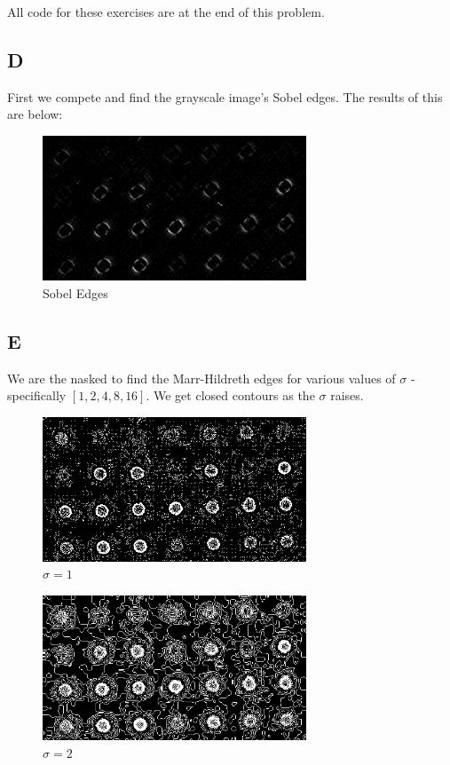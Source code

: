 \documentclass{article}
\begin{document}
All code for these exercises are at the end of this problem.

\subsection*{D}
First we compete and find the grayscale image's Sobel edges. The results of this are below:

\begin{figure}[H]
    \centering
    \includegraphics[width = 0.7\textwidth]{imgs/sobel.jpg}
    \caption{Sobel Edges}
    \label{fig:sobel}
\end{figure}

\subsection*{E}

We are the nasked to find the Marr-Hildreth edges for various values of $\sigma$ - specifically $[1,2,4,8,16]$. We get closed contours as the $\sigma$ raises.

\begin{figure}[H]
    \centering
    \includegraphics[width = 0.7\textwidth]{imgs/mh-1.jpg}
    \caption{$\sigma = 1$}
    \label{fig:mh-1}
\end{figure}

\begin{figure}[H]
    \centering
    \includegraphics[width = 0.7\textwidth]{imgs/mh-2.jpg}
    \caption{$\sigma = 2$}
    \label{fig:mh-2}
\end{figure}
\end{document}
